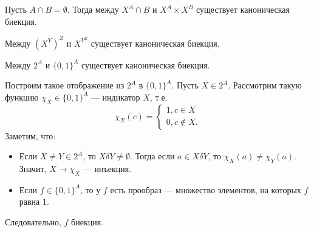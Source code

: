 \documentclass[12pt,a4paper]{article}
\begin{document}
\z Пусть $A\cap B=\emptyset$. Тогда между $X^A\cap B$ и $X^A\times X^B$ существует каноническая биекция.

\z Между ${(X^Y)}^Z$ и $X^{Y^Z}$ существует каноническая биекция.

\z Между $2^A$ и ${\{0,1\}}^A$ существует каноническая биекция.

\proof Построим такое отображение из $2^A$ в ${\{0,1\}}^A$. Пусть $X\in 2^A$. Рассмотрим такую функцию $\chi_X\in{\{0,1\}}^A$ --- индикатор $X$, т.е.
\begin{equation*}
	\chi_X(c)=
	\begin{cases}
		1,c\in X\\
		0,c\notin X.
	\end{cases}
\end{equation*}
Заметим, что:

\begin{itemize}
	\item Если $X\neq Y\in 2^A$, то $X\delta Y\neq\emptyset$. Тогда если $a\in X\delta Y$, то $\chi_X(a)\neq\chi_Y(a)$. Значит, $X\to\chi_X$ --- инъекция.
	\item Если $f\in{\{0,1\}}^A$, то у $f$ есть прообраз --- множество элементов, на которых $f$ равна 1.
\end{itemize}

Следовательно, $f$ биекция.\QEDA\\
\end{document}
